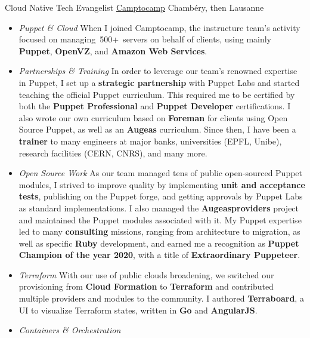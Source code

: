 \documentclass[11pt,a4paper,nolmodern]{moderncv}
\begin{document}
          {Cloud Native Tech Evangelist}
          {\href{http://www.camptocamp.com}{Camptocamp}}
          {Chambéry, then Lausanne}
          {}
          {
  \begin{itemize}
    \item \emph{Puppet \& Cloud}\newline
      When I joined Camptocamp, the instructure team's activity focused on
      managing 500+ servers on behalf of clients, using mainly \textbf{Puppet}, \textbf{OpenVZ}, and \textbf{Amazon Web Services}.
    \item \emph{Partnerships \& Training}\newline
      In order to leverage our team's renowned expertise in Puppet,
      I set up a \textbf{strategic partnership} with Puppet Labs and started teaching the official
      Puppet curriculum. This required me to be certified by both the \textbf{Puppet Professional} and \textbf{Puppet Developer} certifications.
      I also wrote our own curriculum based on \textbf{Foreman} for clients using Open Source Puppet, 
      as well as an \textbf{Augeas} curriculum.\newline
      Since then, I have been a \textbf{trainer} to many engineers at major banks, universities (EPFL, Unibe), research facilities (CERN, CNRS), and many more.
    \item \emph{Open Source Work}\newline
      As our team managed tens of public open-sourced Puppet modules, I strived to improve quality
      by implementing \textbf{unit and acceptance tests}, publishing on the Puppet forge, and getting approvals by Puppet Labs as standard implementations. I also managed the \textbf{Augeasproviders} project and maintained the Puppet modules associated with it.
      My Puppet expertise led to many \textbf{consulting} missions, ranging from architecture to migration,
      as well as specific \textbf{Ruby} development, and earned me a recognition as \textbf{Puppet Champion of the year 2020}, with a title of \textbf{Extraordinary Puppeteer}.
    \item \emph{Terraform}\newline
      With our use of public clouds broadening, we switched our provisioning from \textbf{Cloud Formation} to \textbf{Terraform} and contributed multiple providers and modules to the community.
      I authored \textbf{Terraboard}, a UI to visualize Terraform states, written in \textbf{Go} and \textbf{AngularJS}.
    \item \emph{Containers \& Orchestration}\newline

\end{itemize}}
\end{document}
